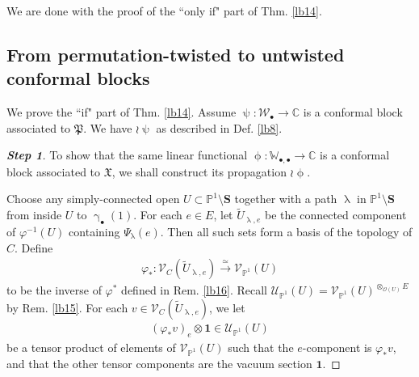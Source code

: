 \documentclass[11pt,b5paper,notitlepage]{article}
\theoremstyle{definition}
\theoremstyle{plain}
\newcommand{\fk}{\mathfrak}
\newcommand{\mc}{\mathcal}
\newcommand{\wtd}{\widetilde}
\newcommand{\id}{\mathbf{1}}
\newcommand{\scr}{\mathscr}
\newcommand{\blt}{\bullet}
\newcommand{\Wbb}{\mathbb W}
\newcommand{\Cbb}{\mathbb C}
\newcommand{\Pbb}{\mathbb P}
\newcommand{\Sbf}{\mathbf{S}}
\numberwithin{equation}{subsection}
\begin{document}
We are done with the proof of the ``only if" part of Thm. \ref{lb14}.




\subsection{From permutation-twisted to untwisted conformal blocks}\label{lb49}


We prove the ``if" part of Thm. \ref{lb14}. Assume $\uppsi:\mc W_\blt\rightarrow\Cbb$ is a conformal block associated to $\fk P$. We have $\wr\uppsi$ as described in Def. \ref{lb8}.



\begin{proof}[\textbf{Step 1}] To show that the same linear functional $\upphi:\Wbb_{\blt,\blt}\rightarrow\Cbb$ is a conformal block associated to $\fk X$, we shall construct its propagation $\wr\upphi$.


Choose any simply-connected open $U\subset\Pbb^1\setminus\Sbf$ together with a path $\uplambda$ in $\Pbb^1\setminus\Sbf$ from inside $U$ to $\upgamma_\blt(1)$. For each $e\in E$, let $\wtd U_{\uplambda,e}$ be the connected component of $\varphi^{-1}(U)$ containing $\Psi_{\uplambda}(e)$. Then all such sets form a basis of the topology of $C$. Define
\begin{align*}
\varphi_*:\scr V_C(\wtd U_{\uplambda,e})\xrightarrow{\simeq}\scr V_{\Pbb^1}(U)	
\end{align*}
to be the inverse of $\varphi^*$ defined in Rem. \ref{lb16}. Recall $\scr U_{\Pbb^1}(U)=\scr V_{\Pbb^1}(U)^{\otimes_{\scr O(U)} E}$ by Rem. \ref{lb15}. For each $v\in\scr V_C(\wtd U_{\uplambda,e})$,  we let
\begin{align*}
(\varphi_*v)_e\otimes\id\in\scr U_{\Pbb^1}(U)	
\end{align*}
be a tensor product of elements of $\scr V_{\Pbb^1}(U)$ such that the $e$-component is $\varphi_*v$, and that the other tensor components are the vacuum section $\id$.


\end{proof}
\end{document}
